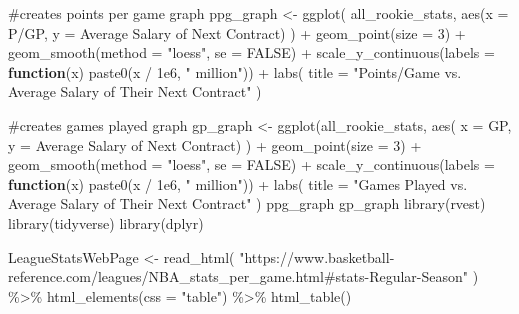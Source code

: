 \documentclass[
  letterpaper,
  DIV=11,
  numbers=noendperiod]{scrartcl}
\newenvironment{Shaded}{\begin{snugshade}}{\end{snugshade}}
\newcommand{\AttributeTok}[1]{\textcolor[rgb]{0.40,0.45,0.13}{#1}}
\newcommand{\CommentTok}[1]{\textcolor[rgb]{0.37,0.37,0.37}{#1}}
\newcommand{\ConstantTok}[1]{\textcolor[rgb]{0.56,0.35,0.01}{#1}}
\newcommand{\ControlFlowTok}[1]{\textcolor[rgb]{0.00,0.23,0.31}{\textbf{#1}}}
\newcommand{\DecValTok}[1]{\textcolor[rgb]{0.68,0.00,0.00}{#1}}
\newcommand{\FloatTok}[1]{\textcolor[rgb]{0.68,0.00,0.00}{#1}}
\newcommand{\FunctionTok}[1]{\textcolor[rgb]{0.28,0.35,0.67}{#1}}
\newcommand{\NormalTok}[1]{\textcolor[rgb]{0.00,0.23,0.31}{#1}}
\newcommand{\OtherTok}[1]{\textcolor[rgb]{0.00,0.23,0.31}{#1}}
\newcommand{\SpecialCharTok}[1]{\textcolor[rgb]{0.37,0.37,0.37}{#1}}
\newcommand{\StringTok}[1]{\textcolor[rgb]{0.13,0.47,0.30}{#1}}
\begin{document}
\begin{Shaded}
\begin{Highlighting}[]
\CommentTok{\#creates points per game graph}
\NormalTok{ppg\_graph }\OtherTok{\textless{}{-}} \FunctionTok{ggplot}\NormalTok{(}
\NormalTok{  all\_rookie\_stats, }\FunctionTok{aes}\NormalTok{(}\AttributeTok{x =} \StringTok{\textasciigrave{}}\AttributeTok{P/GP}\StringTok{\textasciigrave{}}\NormalTok{, }\AttributeTok{y =} \StringTok{\textasciigrave{}}\AttributeTok{Average Salary of Next Contract}\StringTok{\textasciigrave{}}\NormalTok{)}
\NormalTok{  ) }\SpecialCharTok{+}
  \FunctionTok{geom\_point}\NormalTok{(}\AttributeTok{size =} \DecValTok{3}\NormalTok{) }\SpecialCharTok{+}
  \FunctionTok{geom\_smooth}\NormalTok{(}\AttributeTok{method =} \StringTok{"loess"}\NormalTok{, }\AttributeTok{se =} \ConstantTok{FALSE}\NormalTok{) }\SpecialCharTok{+}
  \FunctionTok{scale\_y\_continuous}\NormalTok{(}\AttributeTok{labels =} \ControlFlowTok{function}\NormalTok{(x) }\FunctionTok{paste0}\NormalTok{(x }\SpecialCharTok{/} \FloatTok{1e6}\NormalTok{, }\StringTok{" million"}\NormalTok{)) }\SpecialCharTok{+}
  \FunctionTok{labs}\NormalTok{(}
    \AttributeTok{title =} \StringTok{"Points/Game vs. Average Salary of Their Next Contract"}
\NormalTok{  )}

\CommentTok{\#creates games played graph}
\NormalTok{gp\_graph }\OtherTok{\textless{}{-}} \FunctionTok{ggplot}\NormalTok{(all\_rookie\_stats, }\FunctionTok{aes}\NormalTok{(}
  \AttributeTok{x =} \StringTok{\textasciigrave{}}\AttributeTok{GP}\StringTok{\textasciigrave{}}\NormalTok{, }\AttributeTok{y =} \StringTok{\textasciigrave{}}\AttributeTok{Average Salary of Next Contract}\StringTok{\textasciigrave{}}\NormalTok{)}
\NormalTok{  ) }\SpecialCharTok{+}
  \FunctionTok{geom\_point}\NormalTok{(}\AttributeTok{size =} \DecValTok{3}\NormalTok{) }\SpecialCharTok{+}
  \FunctionTok{geom\_smooth}\NormalTok{(}\AttributeTok{method =} \StringTok{"loess"}\NormalTok{, }\AttributeTok{se =} \ConstantTok{FALSE}\NormalTok{) }\SpecialCharTok{+}
  \FunctionTok{scale\_y\_continuous}\NormalTok{(}\AttributeTok{labels =} \ControlFlowTok{function}\NormalTok{(x) }\FunctionTok{paste0}\NormalTok{(x }\SpecialCharTok{/} \FloatTok{1e6}\NormalTok{, }\StringTok{" million"}\NormalTok{)) }\SpecialCharTok{+}
  \FunctionTok{labs}\NormalTok{(}
    \AttributeTok{title =} \StringTok{"Games Played vs. Average Salary of Their Next Contract"}
\NormalTok{  )}
\NormalTok{ppg\_graph}
\NormalTok{gp\_graph}
\FunctionTok{library}\NormalTok{(rvest)}
\FunctionTok{library}\NormalTok{(tidyverse)}
\FunctionTok{library}\NormalTok{(dplyr)}

\NormalTok{LeagueStatsWebPage }\OtherTok{\textless{}{-}} \FunctionTok{read\_html}\NormalTok{(}
  \StringTok{"https://www.basketball{-}reference.com/leagues/NBA\_stats\_per\_game.html\#stats{-}Regular{-}Season"}
\NormalTok{) }\SpecialCharTok{\%\textgreater{}\%} \FunctionTok{html\_elements}\NormalTok{(}\AttributeTok{css =} \StringTok{"table"}\NormalTok{) }\SpecialCharTok{\%\textgreater{}\%}
  \FunctionTok{html\_table}\NormalTok{()}


\end{Highlighting}
\end{Shaded}
\end{document}
